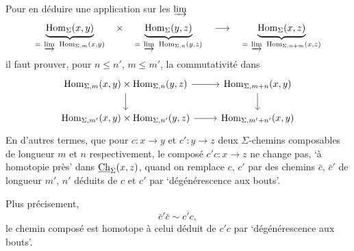 Pour en déduire une application sur les $\varinjlim$
\[
\underbrace{\Hom_\Sigma(x,y)}_{=\ \varinjlim\ \Hom_{\Sigma,m}(x,y)}\quad\times\quad\underbrace{\Hom_\Sigma(y,z)}_{=\ \varinjlim\ \Hom_{\Sigma,n}(y,z)}\quad\longrightarrow\quad\underbrace{\Hom_\Sigma(x,z)}_{=\ \varinjlim\ \Hom_{\Sigma,n+m}(x,z)}
\]
il faut prouver, pour $n\leq n'$, $m\leq m'$, la commutativité dans
\[
\begin{tikzcd}
\Hom_{\Sigma,m}(x,y)\times\Hom_{\Sigma,n}(y,z) \arrow[r] \arrow[d] & \Hom_{\Sigma,m+n}(x,y) \arrow[d] \\
\Hom_{\Sigma,m'}(x,y)\times\Hom_{\Sigma,n'}(y,z) \arrow[r] & \Hom_{\Sigma,m'+n'}(x,y)
\end{tikzcd}
\]
 En d'autres termes, que pour $c:x\longrightarrow y$ et $c':y\longrightarrow z$ deux $\Sigma$-chemins composables de longueur $m$ et $n$ respectivement, le composé $c'c:x\longrightarrow z$ ne change pas, `à homotopie près' dans $\underline{\mathrm{Ch}}_\Sigma(x,z)$, quand on remplace $c$, $c'$ par des chemins $\bar{c}$, $\bar{c}'$ de longueur $m'$, $n'$ déduits de $c$ et $c'$ par `dégénérescence aux bouts'.

Plus précisement, %
\[
\bar{c}'\bar{c}\sim\overline{c'c},
\]
le chemin composé est homotope à celui déduit de $c'c$ par `dégénérescence aux bouts'.

